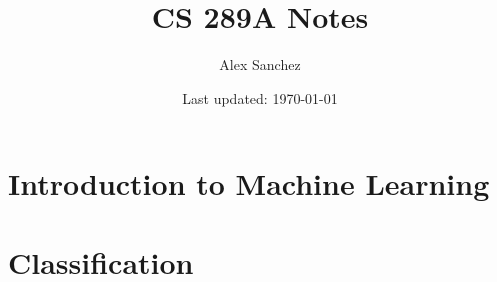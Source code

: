 \documentclass[openany]{book}
\title{CS 289A Notes}
\author{Alex Sanchez}
\date{Last updated: \today}
\begin{document}
\maketitle

\tableofcontents

\chapter{Introduction to Machine Learning}


\chapter{Classification}

\end{document}
